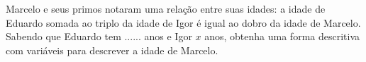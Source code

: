 \documentclass[a4paper,14pt]{article}
\begin{document}
\begin{multicols}{2}
\begin{enumerate}
\begin{center}
\begin{tcolorbox}[colback=white, colframe=black, boxrule=0.5mm, width=6cm]
    		\end{tcolorbox}
    		\end{center}
    		Marcelo e seus primos notaram uma relação entre suas idades: a idade de Eduardo somada ao triplo da idade de Igor é igual ao dobro da idade de Marcelo. Sabendo que Eduardo tem ...... anos e Igor $x$ anos, obtenha uma forma descritiva com variáveis para descrever a idade de Marcelo.
    	\end{enumerate}
    $~$ \\ $~$ \\ $~$ \\ $~$ \\ $~$ \\ $~$ \\ $~$ \\ $~$ \\ $~$ \\ $~$  \\ $~$  \\ $~$  \\ $~$  \\ $~$  \\ $~$  \\ $~$  \\ $~$  \\ $~$ \\ $~$ \\ $~$ \\ $~$ \\ $~$ \\ $~$ \\ $~$
	\end{multicols}
\end{document}
